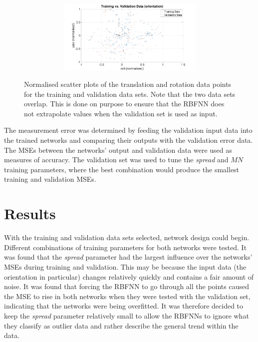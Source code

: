 \begin{figure}
\begin{subfigure}{\textwidth}
\begin{subfigure}{0.48\textwidth}
    \end{subfigure}
    \begin{subfigure}{0.48\textwidth}
      \includegraphics[clip, trim = 80 0 80 0, width=\textwidth]{figures/chapter4/tr_v_v_rollyaw}
    \end{subfigure}
    \caption{}
  \end{subfigure}
  \caption[Scatter plots of the training and validation data. ]{Normalised scatter plots of the translation and rotation data points for the training and validation data sets. Note that the two data sets overlap. This is done on purpose to ensure that the RBFNN does not extrapolate values when the validation set is used as input. }
  \label{fig:chap4-scatter-tr-v}
\end{figure}

The measurement error was determined by feeding the validation input data into the trained networks and comparing their outputs with the validation error data. The MSEs between the networks' output and validation data were used as measures of accuracy. The validation set was used to tune the \emph{spread} and $\mathit{MN}$ training parameters, where the best combination would produce the smallest training and validation MSEs. 

\section{Results}

With the training and validation data sets selected, network design could begin. Different combinations of training parameters for both networks were tested. It was found that the \emph{spread} parameter had the largest influence over the networks' MSEs during training and validation. This may be because the input data (the orientation in particular) changes relatively quickly and contains a fair amount of noise. It was found that forcing the RBFNN to go through all the points caused the MSE to rise in both networks when they were tested with the validation set, indicating that the networks were being overfitted. It was therefore decided to keep the \emph{spread} parameter relatively small to allow the RBFNNs to ignore what they classify as outlier data and rather describe the general trend within the data. 

